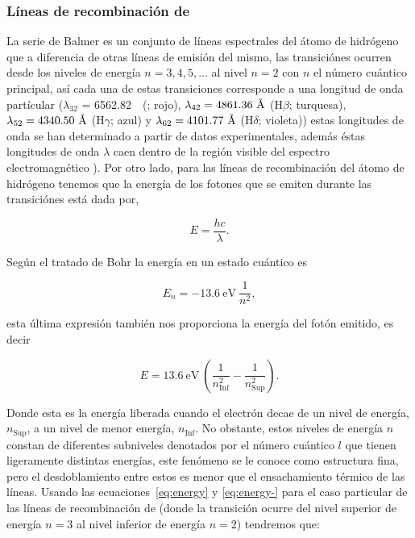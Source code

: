\subsubsection{Líneas de recombinación de \ha{}}
\label{sec:lines-ha}

La serie de Balmer es un conjunto de líneas espectrales del átomo de hidrógeno que a diferencia de otras líneas de emisión del mismo, las transiciónes ocurren desde los niveles de energía \(n= 3,4,5,...\) al nivel \(n=2\) con \(n\) el número cuántico principal, así cada una de estas transiciones corresponde a una longitud de onda partícular (\(\lambda_{32}\) = 6562.82~\A~(\ha{}; rojo), \(\lambda_{42} = 4861.36~\text{\AA{}}{}\) (\(\mathrm{H}\beta\); turquesa), \(\lambda_{52} = 4340.50~\text{\AA{}}{}\) (\(\mathrm{H}\gamma\); azul) y \(\lambda_{62} = 4101.77~\text{\AA{}}{}\) (\(\mathrm{H}\delta\); violeta)) estas longitudes de onda se han determinado a partir de datos experimentales, además éstas longitudes de onda \(\lambda\) caen dentro de la región visible del espectro electromagnético \citep{Carroll:1996}). Por otro lado, para las líneas de recombinación del átomo de hidrógeno tenemos que la energía de los fotones que se emiten durante las transiciónes está dada por,

\begin{equation}
  \label{eq:energy}
  E = \frac{hc}{\lambda}. 
\end{equation}
 
Según el tratado de Bohr la energía en un estado cuántico es

\begin{equation}
  \label{eq:quantum}
  E_{n} = -13.6~\text{eV}~\frac{1}{n^{2}},
\end{equation}

esta última expresión también nos proporciona la energía del fotón emitido, es decir

\begin{equation}
  \label{eq:energy-}
 E = 13.6~\text{eV}~\left(\frac{1}{n_{\text{Inf}}^{2}}-\frac{1}{n_{\text{Sup}}^{2}}\right).
\end{equation}

 Donde esta es la energía liberada cuando el electrón decae de un nivel de energía, \(n_{\text{Sup}}\), a un nivel de menor energía, \(n_{\text{Inf}}\). No obstante, estos niveles de energía \(n\) constan de diferentes subniveles denotados por el número cuántico \(l\) que tienen ligeramente distintas energías, este fenómeno se le conoce como estructura fina, pero el desdoblamiento entre estos es menor que el ensachamiento térmico de las líneas. Usando las ecuaciones~\ref{eq:energy} y \ref{eq:energy-} para el caso particular de las líneas de recombinación de \ha{} (donde la transición ocurre del nivel superior de energía \(n=3\) al nivel inferior de energía \(n=2\)) tendremos que: 

